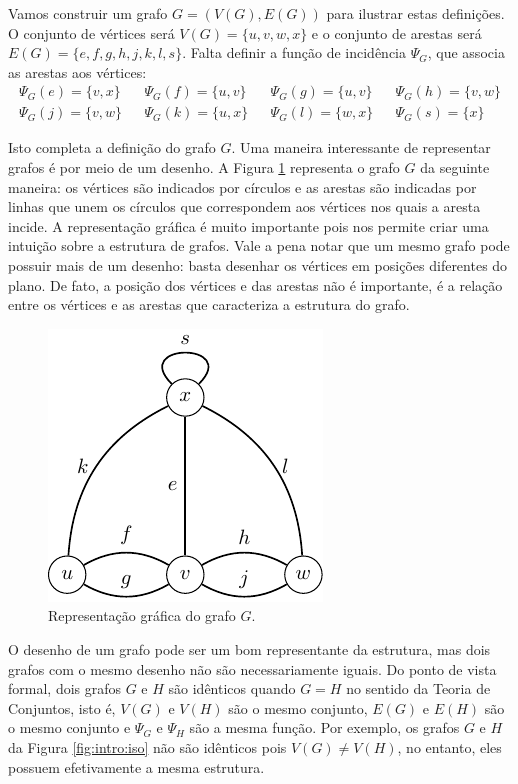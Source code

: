 Vamos construir um grafo $G = (V(G), E(G))$ para ilustrar estas definições. O conjunto de vértices será $V(G) = \{u,v,w,x\}$ e o conjunto de arestas será $E(G) = \{e, f, g, h, j, k, l, s\}$. Falta definir a função de incidência $\Psi_G$, que associa as arestas aos vértices:
\begin{align*}
\Psi_G(e) = \{v,x\} & &
\Psi_G(f) = \{u,v\} & &
\Psi_G(g) = \{u,v\} & &
\Psi_G(h) = \{v,w\} \\
\Psi_G(j) = \{v,w\} & &
\Psi_G(k) = \{u,x\} & &
\Psi_G(l) = \{w,x\} & &
\Psi_G(s) = \{x\}
\end{align*}

Isto completa a definição do grafo $G$. Uma maneira interessante de representar grafos é por meio de um desenho. A Figura \ref{fig:intro:grafo} representa o grafo $G$ da seguinte maneira: os vértices são indicados por círculos e as arestas são indicadas por linhas que unem os círculos que correspondem aos vértices nos quais a aresta incide. A representação gráfica é muito importante pois nos permite criar uma intuição sobre a estrutura de grafos. Vale a pena notar que um mesmo grafo pode possuir mais de um desenho: basta desenhar os vértices em posições diferentes do plano. De fato, a posição dos vértices e das arestas não é importante, é a relação entre os vértices e as arestas que caracteriza a estrutura do grafo.

\begin{figure}[ht!]
\centering
\includegraphics{figures/1_intro_1_grafo}
\caption{Representação gráfica do grafo $G$.}
\label{fig:intro:grafo}
\end{figure}

O desenho de um grafo pode ser um bom representante da estrutura, mas dois grafos com o mesmo desenho não são necessariamente iguais. Do ponto de vista formal, dois grafos $G$ e $H$ são idênticos quando $G = H$ no sentido da Teoria de Conjuntos, isto é, $V(G)$ e $V(H)$ são o mesmo conjunto, $E(G)$ e $E(H)$ são o mesmo conjunto e $\Psi_G$ e $\Psi_H$ são a mesma função. Por exemplo, os grafos $G$ e $H$ da Figura \ref{fig:intro:iso} não são idênticos pois $V(G) \neq V(H)$, no entanto, eles possuem efetivamente a mesma estrutura.


